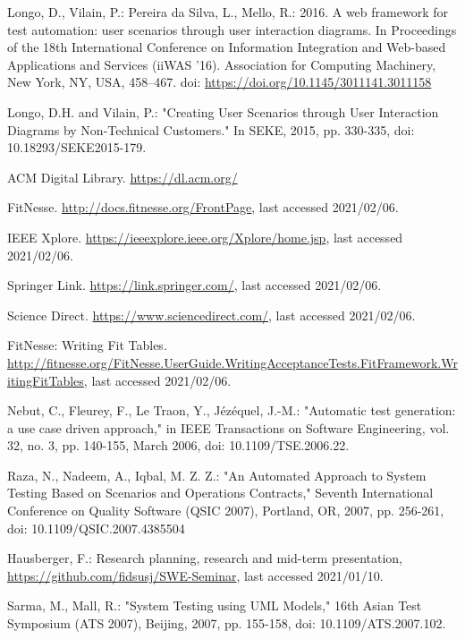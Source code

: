 \documentclass[a4paper,10pt, bibliography=totocnumbered]{scrreprt}
\begin{document}
\begin{thebibliography}{9}
 Longo, D., Vilain, P.: Pereira da Silva, L., Mello, R.: 2016. A web framework for test automation: user scenarios through user interaction diagrams. In Proceedings of the 18th International Conference on Information Integration and Web-based Applications and Services (iiWAS '16). Association for Computing Machinery, New York, NY, USA, 458–467. doi: \url{https://doi.org/10.1145/3011141.3011158}

 Longo, D.H. and Vilain, P.: "Creating User Scenarios through User Interaction Diagrams by Non-Technical Customers." In SEKE, 2015, pp. 330-335, doi: 10.18293/SEKE2015-179.

 ACM Digital Library. \url{https://dl.acm.org/} 

 FitNesse. \url{http://docs.fitnesse.org/FrontPage}, last accessed 2021/02/06.

 IEEE Xplore. \url{https://ieeexplore.ieee.org/Xplore/home.jsp}, last accessed 2021/02/06.

 Springer Link. \url{https://link.springer.com/}, last accessed 2021/02/06.

 Science Direct. \url{https://www.sciencedirect.com/}, last accessed 2021/02/06.

 FitNesse: Writing Fit Tables. \url{http://fitnesse.org/FitNesse.UserGuide.WritingAcceptanceTests.FitFramework.WritingFitTables}, last accessed 2021/02/06.


 Nebut, C., Fleurey, F., Le Traon, Y., Jézéquel, J.-M.: "Automatic test generation: a use case driven approach," in IEEE Transactions on Software Engineering, vol. 32, no. 3, pp. 140-155, March 2006, doi: 10.1109/TSE.2006.22.

 Raza, N., Nadeem, A., Iqbal, M. Z. Z.: "An Automated Approach to System Testing Based on Scenarios and Operations Contracts," Seventh International Conference on Quality Software (QSIC 2007), Portland, OR, 2007, pp. 256-261, doi: 10.1109/QSIC.2007.4385504

 Hausberger, F.: Research planning, research and mid-term presentation, \url{https://github.com/fidsusj/SWE-Seminar}, last accessed 2021/01/10.

 Sarma, M., Mall, R.: "System Testing using UML Models," 16th Asian Test Symposium (ATS 2007), Beijing, 2007, pp. 155-158, doi: 10.1109/ATS.2007.102.


\end{thebibliography}
\end{document}
